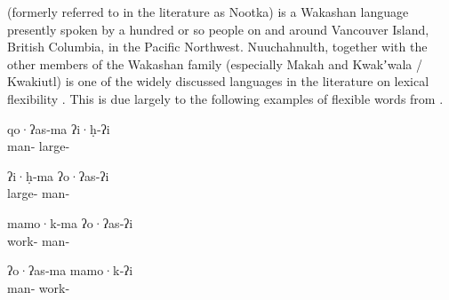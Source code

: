  (formerly referred to in the literature as Nootka) is a Wakashan language presently spoken by a hundred or so people on and around Vancouver Island, British Columbia, in the Pacific Northwest. Nuuchahnulth, together with the other members of the Wakashan family (especially Makah and Kwakʼwala / Kwakiutl) is one of the widely discussed languages in the literature on lexical flexibility \parencites{Swadesh1939b}{Jacobsen1979}{Braithwaite2015}. This is due largely to the following examples of flexible words from \textcite{Swadesh1939b}.

\begin{exe}

  \ex\label{ex:1.8}
  \begin{xlist}

    \ex
    \gll qo·ʔas‑ma        ʔi·ḥ‑ʔi\\
         man‑ large‑\\

    \ex
    \gll ʔi·ḥ‑ma            ʔo·ʔas‑ʔi\\
         large‑ man‑\\

  \end{xlist}

  \ex\label{ex:1.9}
  \begin{xlist}

    \ex
    \gll mamo·k‑ma         ʔo·ʔas‑ʔi\\
         work‑ man‑\\

    \ex
    \gll ʔo·ʔas‑ma        mamo·k‑ʔi\\
         man‑ work‑\\

  \end{xlist}

\end{exe}

